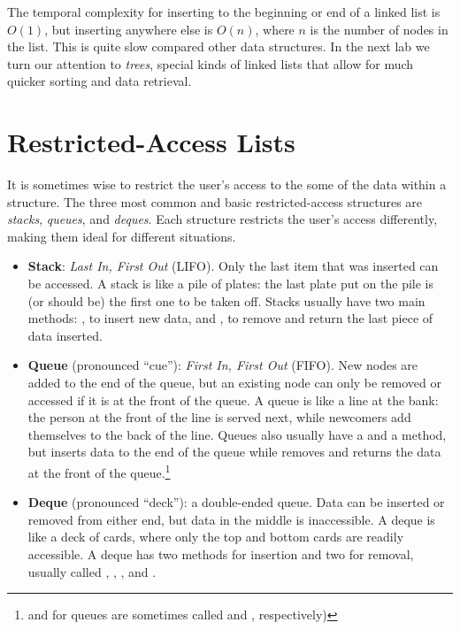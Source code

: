 \begin{info} %
The temporal complexity for inserting to the beginning or end of a linked list is $O(1)$, but inserting anywhere else is $O(n)$, where $n$ is the number of nodes in the list.
This is quite slow compared other data structures.
In the next lab we turn our attention to \emph{trees}, special kinds of linked lists that allow for much quicker sorting and data retrieval.
\end{info}

\section*{Restricted-Access Lists} %

It is sometimes wise to restrict the user's access to the some of the data within a structure.
The three most common and basic restricted-access structures are \emph{stacks}, \emph{queues}, and \emph{deques}.
Each structure restricts the user's access differently, making them ideal for different situations.

\begin{itemize}
\item \textbf{Stack}: \emph{Last In, First Out} (LIFO).
Only the last item that was inserted can be accessed.
A stack is like a pile of plates: the last plate put on the pile is (or should be) the first one to be taken off.
Stacks usually have two main methods: , to insert new data, and , to remove and return the last piece of data inserted.

\item \textbf{Queue} (pronounced ``cue''): \emph{First In, First Out} (FIFO).
New nodes are added to the end of the queue, but an existing node can only be removed or accessed if it is at the front of the queue.
A queue is like a line at the bank: the person at the front of the line is served next, while newcomers add themselves to the back of the line.
Queues also usually have a  and a  method, but  inserts data to the end of the queue while  removes and returns the data at the front of the queue.\footnote{ and  for queues are sometimes called  and , respectively)}

\item \textbf{Deque} (pronounced ``deck''): a double-ended queue.
Data can be inserted or removed from either end, but data in the middle is inaccessible.
A deque is like a deck of cards, where only the top and bottom cards are readily accessible.
A deque has two methods for insertion and two for removal, usually called , , , and .
\end{itemize}

